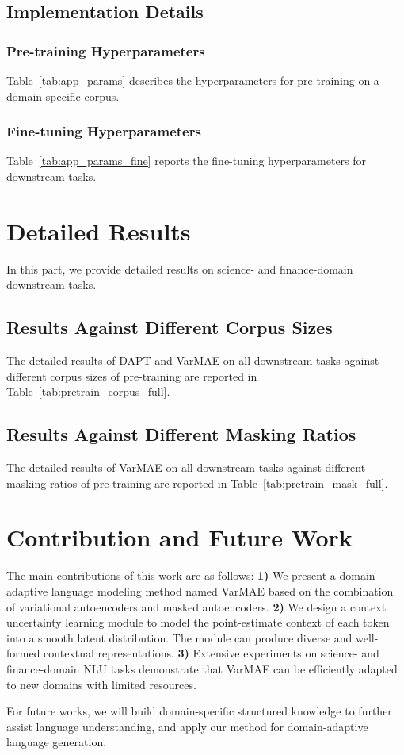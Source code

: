 \documentclass[11pt]{article}
\begin{document}
\subsection{Implementation Details} \label{sec:appendix_exp}

\subsubsection{Pre-training Hyperparameters} \label{sec:appendix_exp_pretrain}
Table~\ref{tab:app_params} describes the hyperparameters for pre-training on a domain-specific corpus.



\subsubsection{Fine-tuning Hyperparameters}  \label{sec:appendix_exp_fine}
Table~\ref{tab:app_params_fine} reports the fine-tuning hyperparameters for downstream tasks.




\section{Detailed Results} \label{sec:appendix_result}


In this part, we provide detailed results on science- and finance-domain downstream tasks.


\subsection{Results Against Different Corpus Sizes} \label{sec:appendix_corpus}
The detailed results of DAPT and VarMAE on all downstream tasks against different corpus sizes of pre-training are reported in Table~\ref{tab:pretrain_corpus_full}.


\subsection{Results Against Different Masking Ratios} \label{sec:appendix_mask}
{The detailed results of VarMAE on all downstream tasks against different masking ratios of pre-training are reported in Table~\ref{tab:pretrain_mask_full}.}




\section{Contribution and Future Work}
The main contributions of this work are as follows:
\textbf{1)} 
We present a domain-adaptive language modeling method named VarMAE based on the combination of variational autoencoders and masked autoencoders.
\textbf{2)} 
We design a context uncertainty learning module to model the point-estimate context of each token into a smooth latent distribution. 
The module can produce diverse and well-formed contextual representations. 
\textbf{3)}
Extensive experiments on science- and finance-domain NLU tasks demonstrate that VarMAE can be efficiently adapted to new domains with limited resources.

For future works, we will build domain-specific structured knowledge to further assist language understanding, and apply our method for domain-adaptive language generation.
\end{document}
